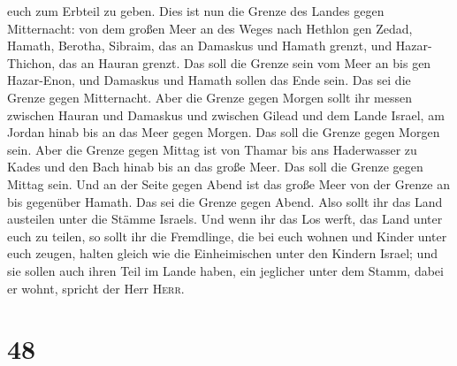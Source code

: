 euch zum Erbteil zu geben.  Dies ist nun die Grenze des
Landes gegen Mitternacht: von dem großen Meer an des Weges nach Hethlon
gen Zedad,  Hamath, Berotha, Sibraim, das an Damaskus und
Hamath grenzt, und Hazar-Thichon, das an Hauran grenzt. 
Das soll die Grenze sein vom Meer an bis gen Hazar-Enon, und Damaskus
und Hamath sollen das Ende sein. Das sei die Grenze gegen Mitternacht.
 Aber die Grenze gegen Morgen sollt ihr messen zwischen
Hauran und Damaskus und zwischen Gilead und dem Lande Israel, am Jordan
hinab bis an das Meer gegen Morgen. Das soll die Grenze gegen Morgen
sein.  Aber die Grenze gegen Mittag ist von Thamar bis
ans Haderwasser zu Kades und den Bach hinab bis an das große Meer. Das
soll die Grenze gegen Mittag sein.  Und an der Seite
gegen Abend ist das große Meer von der Grenze an bis gegenüber Hamath.
Das sei die Grenze gegen Abend.  Also sollt ihr das Land
austeilen unter die Stämme Israels.  Und wenn ihr das Los
werft, das Land unter euch zu teilen, so sollt ihr die Fremdlinge, die
bei euch wohnen und Kinder unter euch zeugen, halten gleich wie die
Einheimischen unter den Kindern Israel;  und sie sollen
auch ihren Teil im Lande haben, ein jeglicher unter dem Stamm, dabei er
wohnt, spricht der Herr \textsc{Herr}.

\hypertarget{section-47}{%
\section{48}\label{section-47}}

